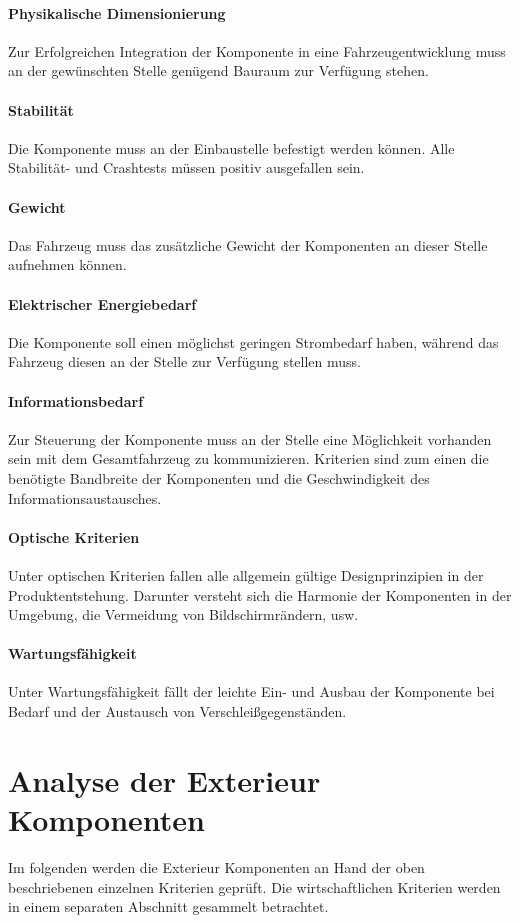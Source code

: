 \paragraph{Physikalische Dimensionierung}
Zur Erfolgreichen Integration der Komponente in eine Fahrzeugentwicklung muss an der gewünschten Stelle genügend Bauraum zur Verfügung stehen.
\paragraph{Stabilität}
Die Komponente muss an der Einbaustelle befestigt werden können. Alle Stabilität- und Crashtests müssen positiv ausgefallen sein.
\paragraph{Gewicht}
Das Fahrzeug muss das zusätzliche Gewicht der Komponenten an dieser Stelle aufnehmen können.
\paragraph{Elektrischer Energiebedarf}
Die Komponente soll einen möglichst geringen Strombedarf haben, während das Fahrzeug diesen an der Stelle zur Verfügung stellen muss.
\paragraph{Informationsbedarf}
Zur Steuerung der Komponente muss an der Stelle eine Möglichkeit vorhanden sein mit dem Gesamtfahrzeug zu kommunizieren. Kriterien sind zum einen die benötigte Bandbreite der Komponenten und die Geschwindigkeit des Informationsaustausches.
\paragraph{Optische Kriterien}
Unter optischen Kriterien fallen alle allgemein gültige Designprinzipien in der Produktentstehung. Darunter versteht sich die Harmonie der Komponenten in der Umgebung, die Vermeidung von Bildschirmrändern, usw.
\paragraph{Wartungsfähigkeit}
Unter Wartungsfähigkeit fällt der leichte Ein- und Ausbau der Komponente bei Bedarf und der Austausch von Verschleißgegenständen.
\section{Analyse der Exterieur Komponenten}
Im folgenden werden die Exterieur Komponenten an Hand der oben beschriebenen einzelnen Kriterien geprüft. Die wirtschaftlichen Kriterien werden in einem separaten Abschnitt gesammelt betrachtet. 
